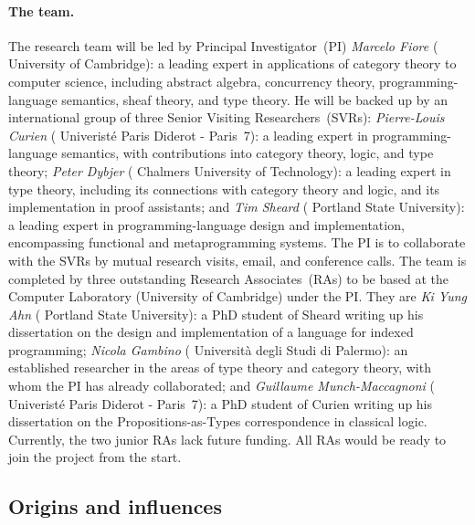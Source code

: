 \documentclass[11pt,twocolumn]{article}
\begin{document}
\paragraph*{The team.}

The research team will be led by Principal Investigator~(PI) \emph{Marcelo
Fiore} (%
University of Cambridge): 
    a leading expert in applications of category theory to computer science,
    including abstract algebra, concurrency theory, programming-language
    semantics, sheaf theory, and type theory.  
He will be backed up by an international group of three Senior Visiting
Researchers~(SVRs): \emph{Pierre-Louis Curien} (%
Univerist\'e Paris Diderot - Paris~7): 
  a leading expert in programming-language semantics, with contributions into
  category theory, logic, %
  and type theory; 
  \emph{Peter \mbox{Dybjer}} (%
Chalmers University of Technology): 
  a leading expert in type theory, including its connections with category
  theory and logic, and its implementation in proof assistants; and 
  \emph{Tim Sheard} (%
Portland State University): 
  a leading expert in pro\-gram\-ming-language design and implementation,
  encompassing functional and metaprogramming systems. 
%
The PI is to collaborate with the SVRs by mutual research visits, email, and
conference calls.
%
The team is completed by three outstanding Research Associates~(RAs) to be
based at the Computer Laboratory (University of Cambridge) under the PI.  They
are
  \emph{Ki Yung Ahn} (%
Portland State University): 
  a PhD student of Sheard writing up his dissertation on the design and
  implementation of a language for indexed programming;
  \emph{Nicola \mbox{Gambino}} (%
Universit\`a degli Studi di Palermo):  
  an established researcher in the areas of type theory and category theory,
  with whom the PI has already collaborated; and 
  \emph{Guillaume Munch-Maccagnoni} (%
Univerist\'e Paris Diderot - Paris~7): 
  a PhD student of Curien writing up his dissertation on the
  Propositions-as-Types correspondence in classical logic.
Currently, the two junior RAs lack future funding.  All RAs would be ready
to join the project from the start.

\subsection{Origins and influences}
\label{Origins}
\end{document}
